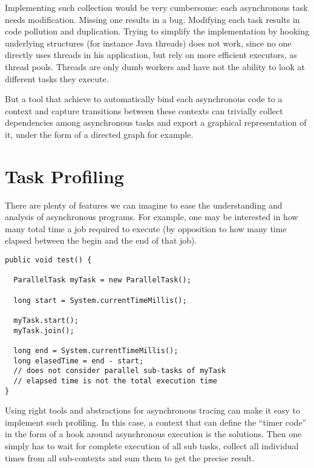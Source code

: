 Implementing such collection would be very cumbersome: each asynchronous task needs modification. Missing one results in a bug. Modifying each task results in code pollution and duplication. Trying to simplify the implementation by hooking underlying structures (for instance Java threads) does not work, since no one directly uses threads in his application, but rely on more efficient executors, as thread pools. Threads are only dumb workers and have not the ability to look at different tasks they execute.

But a tool that achieve to automatically bind each asynchronous code to a context and capture transitions between these contexts can trivially collect dependencies among asynchronous tasks and export a graphical representation of it, under the form of a directed graph for example.

\section{Task Profiling}

There are plenty of features we can imagine to ease the understanding and analysis of asynchronous programs. For example, one may be interested in how many total time a job required to execute (by opposition to how many time elapsed between the begin and the end of that job).

\begin{lstlisting}
public void test() {
  
  ParallelTask myTask = new ParallelTask();

  long start = System.currentTimeMillis();

  myTask.start();
  myTask.join();

  long end = System.currentTimeMillis();
  long elasedTime = end - start;
  // does not consider parallel sub-tasks of myTask
  // elapsed time is not the total execution time
}
\end{lstlisting}

Using right tools and abstractions for asynchronous tracing can make it easy to implement such profiling. In this case, a context that can define the ``timer code'' in the form of a hook around asynchronous execution is the solutions. Then one simply has to wait for complete execution of all sub tasks, collect all individual times from all sub-contexts and sum them to get the precise result.

